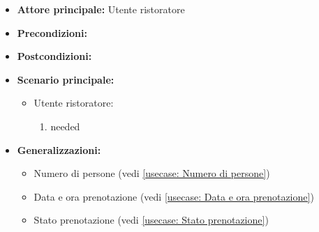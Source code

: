 \label{usecase:Dettaglio prenotazione}
\begin{itemize}
	\item \textbf{Attore principale:}  Utente ristoratore
	\item \textbf{Precondizioni:}
	\item \textbf{Postcondizioni:}
	\item \textbf{Scenario principale:}
	      \begin{itemize}
		      \item  Utente ristoratore:
		            \begin{enumerate}
			            \item needed
		            \end{enumerate}
	      \end{itemize}
	\item \textbf{Generalizzazioni:}
	      \begin{itemize}
		      \item  Numero di persone (vedi \autoref{usecase: Numero di persone})
		      \item  Data e ora prenotazione (vedi \autoref{usecase: Data e ora prenotazione})
		      \item  Stato prenotazione (vedi \autoref{usecase: Stato prenotazione})
	      \end{itemize}
\end{itemize}
